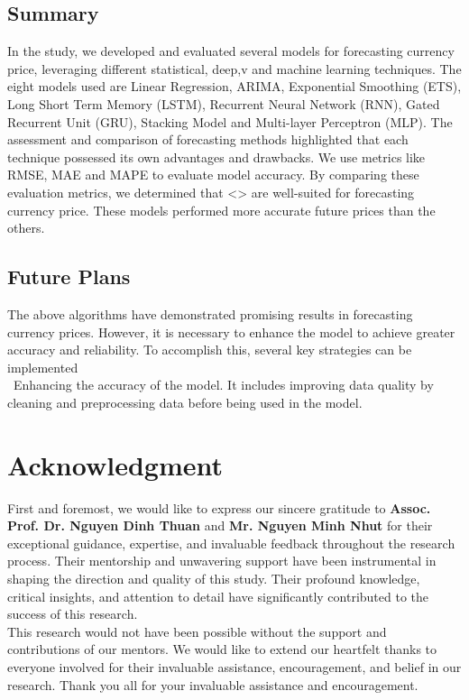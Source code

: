 \documentclass{ieeeojies}
\begin{document}
\subsection{Summary}
In the study, we developed and evaluated several models for forecasting currency price, leveraging different statistical, deep,v and machine learning techniques. The eight models used are Linear Regression, ARIMA, Exponential Smoothing (ETS), Long Short Term Memory (LSTM), Recurrent Neural Network (RNN), Gated
Recurrent Unit (GRU), Stacking Model and Multi-layer Perceptron (MLP). The assessment and comparison of forecasting methods highlighted that each technique possessed its own advantages and drawbacks. We use metrics like RMSE, MAE and MAPE to evaluate model accuracy. By comparing these evaluation metrics, we determined that <> are well-suited for forecasting currency price. These models performed more accurate future prices than the others. 
\subsection{Future Plans}
The above algorithms have demonstrated promising results in forecasting currency prices. However, it is necessary to enhance the model to achieve greater accuracy and reliability. To accomplish this, several key strategies can be implemented \\
\indent\textbullet\ Enhancing the accuracy of the model. It includes improving data quality by cleaning and preprocessing data before being used in the model.\\

\section*{Acknowledgment}
First and foremost, we would like to express our sincere gratitude to \textbf{Assoc. Prof. Dr. Nguyen Dinh Thuan} and \textbf{Mr. Nguyen Minh Nhut} for their exceptional guidance, expertise, and invaluable feedback throughout the research process. Their mentorship and unwavering support have been instrumental in shaping the direction and quality of this study. Their profound knowledge, critical insights, and attention to detail have significantly contributed to the success of this research.
\\This research would not have been possible without the support and contributions of our mentors. We would like to extend our heartfelt thanks to everyone involved for their invaluable assistance, encouragement, and belief in our research. Thank you all for your invaluable assistance and encouragement.
\end{document}
